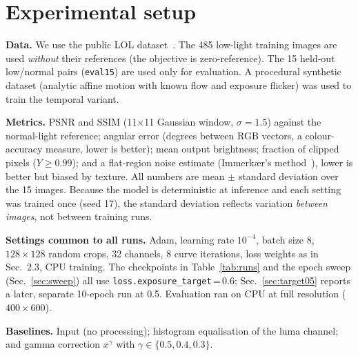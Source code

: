 \documentclass{article}
\newcommand{\code}[1]{\texttt{#1}}
\begin{document}
\begin{itemize}[nosep]
\end{itemize}

\section{Experimental setup}\label{sec:setup}
\textbf{Data.} We use the public LOL dataset~\cite{lol}. The 485 low-light training images are used \emph{without} their references (the objective is zero-reference). The 15 held-out low/normal pairs (\code{eval15}) are used only for evaluation. A procedural synthetic dataset (analytic affine motion with known flow and exposure flicker) was used to train the temporal variant.

\textbf{Metrics.} PSNR and SSIM (11$\times$11 Gaussian window, $\sigma=1.5$) against the normal-light reference; angular error (degrees between RGB vectors, a colour-accuracy measure, lower is better); mean output brightness; fraction of clipped pixels ($Y\ge0.99$); and a flat-region noise estimate (Immerk{\ae}r's method~\cite{immerkaer}), lower is better but biased by texture. All numbers are mean $\pm$ standard deviation over the 15 images. Because the model is deterministic at inference and each setting was trained once (seed 17), the standard deviation reflects variation \emph{between images}, not between training runs.

\textbf{Settings common to all runs.} Adam, learning rate $10^{-4}$, batch size 8, $128\times128$ random crops, 32 channels, 8 curve iterations, loss weights as in Sec.~2.3, CPU training. The checkpoints in Table~\ref{tab:runs} and the epoch sweep (Sec.~\ref{sec:sweep}) all use \code{loss.exposure\_target}\,=\,0.6; Sec.~\ref{sec:target05} reports a later, separate 10-epoch run at 0.5. Evaluation ran on CPU at full resolution ($400\times600$).

\textbf{Baselines.} Input (no processing); histogram equalisation of the luma channel; and gamma correction $x^{\gamma}$ with $\gamma\in\{0.5,0.4,0.3\}$.
\end{document}
